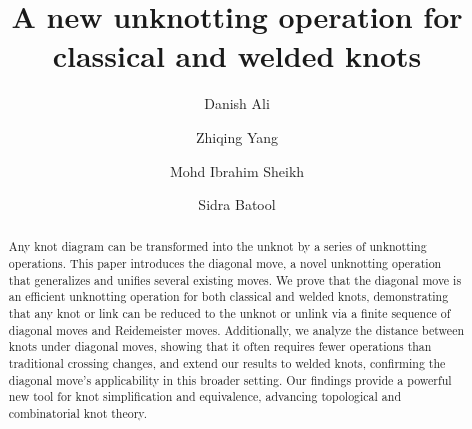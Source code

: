 \documentclass[12pt]{amsart}
\theoremstyle{remark}
\begin{document}
\title{A new unknotting operation for classical and welded knots}

\author{Danish Ali}
\address{School of Mathematical Sciences, Dalian University of Technology, China}

\author{Zhiqing Yang}
\address{School of Mathematical Sciences, Dalian University of Technology, China}

\author{Mohd Ibrahim Sheikh}
\address{Department of Mathematics, Pusan National University, Republic of Korea}

\author{Sidra Batool}
\address{School of Mathematical Sciences, Dalian University of Technology, China}


\begin{abstract}
Any knot diagram can be transformed into the unknot by a series of unknotting operations. This paper introduces the diagonal move, a novel unknotting operation that generalizes and unifies several existing moves. We prove that the diagonal move is an efficient unknotting operation for both classical and welded knots, demonstrating that any knot or link can be reduced to the unknot or unlink via a finite sequence of diagonal moves and Reidemeister moves. Additionally, we analyze the distance between knots under diagonal moves, showing that it often requires fewer operations than traditional crossing changes, and extend our results to welded knots, confirming the diagonal move's applicability in this broader setting. Our findings provide a powerful new tool for knot simplification and equivalence, advancing topological and combinatorial knot theory.
\end{abstract}
\maketitle
\end{document}

